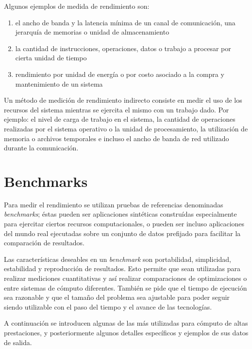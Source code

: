 \documentclass[a4paper]{report}
\begin{document}
Algunos ejemplos de medida de rendimiento son:

\begin{enumerate}
\item el ancho de banda y la latencia m\'inima de un canal de comunicaci\'on,
  una jerarqu\'ia de memorias o unidad de almacenamiento
\item la cantidad de instrucciones, operaciones, datos o trabajo a procesar
  por cierta unidad de tiempo
\item rendimiento por unidad de energ\'ia o por costo asociado a la compra y mantenimiento de un sistema
\end{enumerate}

Un m\'etodo de medici\'on de rendimiento indirecto consiste en medir el uso de
los recursos del sistema mientras se ejercita el mismo con un trabajo dado.
Por ejemplo: el nivel de carga de trabajo en el sistema, la cantidad de operaciones realizadas por el
sistema operativo o la unidad de procesamiento, la utilizaci\'on de memoria o
archivos temporales e incluso el ancho de banda de red utilizado durante la comunicaci\'on.

\section{Benchmarks}

Para medir el rendimiento se utilizan pruebas de referencias denominadas
{\em benchmarks}; \'estas pueden ser aplicaciones sint\'eticas constru\'idas
especialmente para ejercitar ciertos recursos computacionales, o pueden ser incluso
aplicaciones del mundo real ejecutadas sobre un conjunto de datos prefijado para
facilitar la comparaci\'on de resultados.

\bigskip

Las caracter\'isticas deseables en un {\it benchmark} son portabilidad, simplicidad, estabilidad y
reproducci\'on de resultados. Esto permite que sean utilizadas para realizar
mediciones cuantitativas y as\'i realizar comparaciones de optimizaciones o
entre sistemas de c\'omputo diferentes. Tambi\'en se pide que el tiempo de
ejecuci\'on sea razonable y que el tama\~no del problema sea ajustable para
poder seguir siendo utilizable con el paso del tiempo y el avance de las
tecnolog\'ias.

\bigskip

A continuaci\'on se introducen algunas de las m\'as utilizadas para c\'omputo
de altas prestaciones, y posteriormente algunos detalles espec\'ificos y ejemplos de sus datos de salida.
\end{document}
